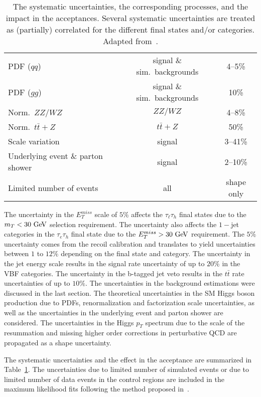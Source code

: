 \begin{table}[!ht]
\begin{center}
\begin{tabular}{lcc}
\hline
 PDF ($qq$)                          & signal \& sim.\ backgrounds  & 4--5\% \\
 PDF ($gg$)                          & signal \& sim.\ backgrounds  & 10\% \\
 Norm.\ $ZZ/WZ$            & $ZZ/WZ$ & 4--8\% \\
 Norm.\ $t\bar{t} + Z$            & $t\bar{t} + Z$ & 50\% \\
 Scale variation                         & signal                       & 3--41\% \\
 Underlying event \& parton shower      & signal                       & 2--10\% \\
\hline
 Limited number of events                & all                 & shape only \\
\end{tabular}
\caption{The systematic uncertainties, the corresponding processes, and the impact in the acceptances. Several systematic uncertainties are treated as (partially) correlated for the different final states and/or categories. Adapted from~\cite{Chatrchyan:2014nva}.
}
\label{tab:uncertainties}
\end{center}
\end{table} 

The uncertainty in the  $E_{T}^{miss}$ scale of $5\%$ affects the $\tau_{\ell}\tau_h$ final states due to the $m_{T}<30~\mathrm{Ge\kern -0.1em V}$ selection requirement. The uncertainty also affects the $1-$jet categories in the $\tau_e\tau_h$ final state due to the $E_{T}^{miss}>30~\mathrm{Ge\kern -0.1em V}$ requirement.  The $5\%$ uncertainty comes from the recoil calibration and translates to yield uncertainties between $1$ to $12\%$ depending on the final state and category. The uncertainty in the jet energy scale results in the signal rate uncertainty of up to $20\%$ in the VBF categories. The uncertainty in the b-tagged jet veto results in the $t\bar{t}$ rate uncertainties of up to $10\%$. The uncertainties in the background estimations were discussed in the last section. The theoretical uncertainties in the SM Higgs boson production due to PDFs, renormalization and factorization scale uncertainties, as well as the uncertainties in the underlying event and parton shower are considered. The uncertainties in the Higgs $p_T$ spectrum due to the scale of the resummation and missing higher order corrections in perturbative QCD are propagated as a shape uncertainty.    

The systematic uncertainties and the effect in the acceptance are summarized in Table~\ref{tab:uncertainties}. The uncertainties due to limited number of simulated events or due to limited number of data events in the control regions are included in the maximum likelihood fits following the method proposed in~\cite{Barlow:1993dm}.   

